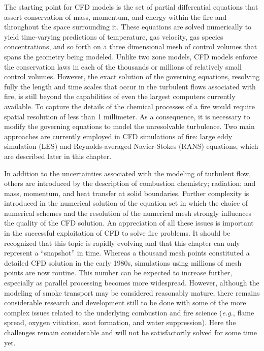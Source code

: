 \documentclass[graybox]{svmult}
\begin{document}
The starting point for CFD models is the set of partial differential equations that assert conservation of mass, momentum, and energy within the fire and throughout the space surrounding it. These equations are solved numerically to yield time-varying predictions of temperature,  gas  velocity,  gas species concentrations, and so forth on a three dimensional mesh of control volumes that spans the geometry being modeled. Unlike two zone models, CFD models enforce the conservation laws in each of the thousands or millions of relatively small control volumes. However, the exact solution of the governing equations, resolving fully the length and time scales that occur in the turbulent flows associated with fire, is still beyond the capabilities of even the largest computers currently available. To capture the details of the chemical processes of a fire would require spatial resolution of less than 1 millimeter. As a consequence, it is necessary to modify the governing equations to model the unresolvable turbulence. Two main approaches are currently employed in CFD simulations of fire: large eddy simulation (LES) and Reynolds-averaged Navier-Stokes (RANS) equations, which are described later in this chapter.

In addition to the uncertainties associated with the modeling of turbulent flow, others are introduced by the description of combustion chemistry; radiation; and mass, momentum, and heat transfer at solid boundaries. Further complexity is introduced in the numerical solution of the equation set in which the choice of numerical schemes and the resolution of the numerical mesh strongly influences the quality of the CFD solution. An appreciation of all these issues is important in the successful exploitation of CFD to solve fire problems.
It should be recognized that this topic is rapidly evolving and that this chapter can only represent a ``snapshot'' in time. Whereas a thousand mesh points constituted a detailed CFD solution in the early 1980s, simulations using millions of mesh points are now routine. This number can be expected to increase further, especially as parallel processing becomes more widespread. However, although the modeling of smoke transport may be considered reasonably mature, there remains considerable research and development still to be done with some of the more complex issues related to the underlying combustion and fire science ({\em e.g.}, flame spread, oxygen vitiation, soot formation, and water suppression). Here the challenges remain considerable and will not be satisfactorily solved for some time yet.
\end{document}
